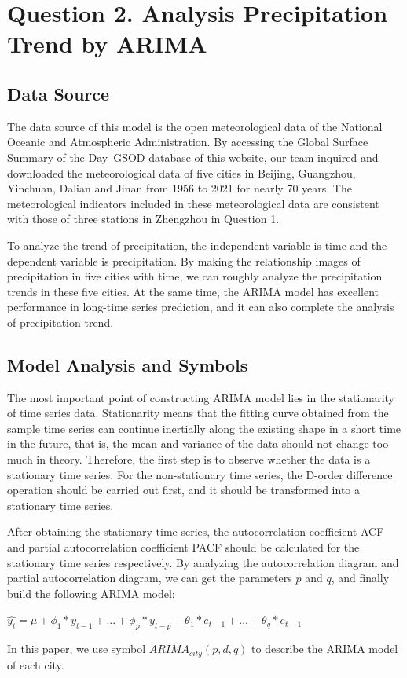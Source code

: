 \documentclass{swmcmthesis}
\begin{document}
\section{Question 2. Analysis Precipitation Trend by ARIMA}

\subsection{Data Source}
\hspace{1em}
The data source of this model is the open meteorological data of the National Oceanic and Atmospheric Administration. By accessing the Global Surface Summary of the Day–GSOD database of this website, our team inquired and downloaded the meteorological data of five cities in Beijing, Guangzhou, Yinchuan, Dalian and Jinan from 1956 to 2021 for nearly 70 years. The meteorological indicators included in these meteorological data are consistent with those of three stations in Zhengzhou in Question 1.
\par
To analyze the trend of precipitation, the independent variable is time and the dependent variable is precipitation. By making the relationship images of precipitation in five cities with time, we can roughly analyze the precipitation trends in these five cities. At the same time, the ARIMA model has excellent performance in long-time series prediction, and it can also complete the analysis of precipitation trend.

\subsection{Model Analysis and Symbols}
\hspace{1em}
The most important point of constructing ARIMA model lies in the stationarity of time series data. Stationarity means that the fitting curve obtained from the sample time series can continue inertially along the existing shape in a short time in the future, that is, the mean and variance of the data should not change too much in theory. Therefore, the first step is to observe whether the data is a stationary time series. For the non-stationary time series, the D-order difference operation should be carried out first, and it should be transformed into a stationary time series.
\par
After obtaining the stationary time series, the autocorrelation coefficient ACF and partial autocorrelation coefficient PACF should be calculated for the stationary time series respectively. By analyzing the autocorrelation diagram and partial autocorrelation diagram, we can get the parameters $p$ and $q$, and finally build the following ARIMA model:
\begin{center}
    $\hat{y_t} = \mu + \phi_1*y_{t-1} + ... + \phi_{p}*y_{t-p} + \theta_1*e_{t-1} + ... + \theta_q*e_{t-1} $
\end{center}
\par
In this paper, we use symbol $ARIMA_{city}(p,d,q)$ to describe the ARIMA model of each city.
\end{document}
